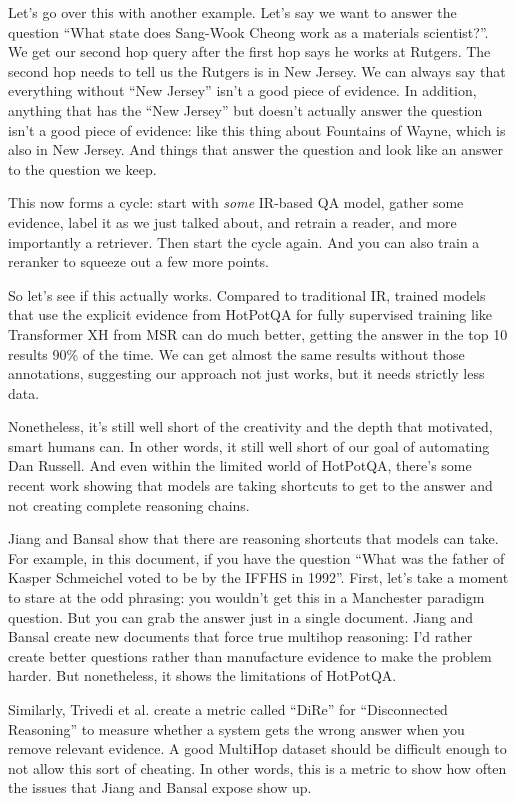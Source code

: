 Let’s go over this with another example.  Let’s say we want to answer the question “What state does Sang-Wook Cheong work as a materials scientist?”.  We get our second hop query after the first hop says he works at Rutgers.  The second hop needs to tell us the Rutgers is in New Jersey.  We can always say that everything without “New Jersey” isn’t a good piece of evidence.  In addition, anything that has the “New Jersey” but doesn’t actually answer the question isn’t a good piece of evidence: like this thing about Fountains of Wayne, which is also in New Jersey.  And things that answer the question and look like an answer to the question we keep.

This now forms a cycle: start with \emph{some} IR-based QA model, gather some evidence, label it as we just talked about, and retrain a reader, and more importantly a retriever.  Then start the cycle again.  And you can also train a reranker to squeeze out a few more points.

So let’s see if this actually works.  Compared to traditional IR, trained models that use the explicit evidence from HotPotQA for fully supervised training like Transformer XH from MSR can do much better, getting the answer in the top 10 results 90\% of the time.  We can get almost the same results without those annotations, suggesting our approach not just works, but it needs strictly less data.

Nonetheless, it’s still well short of the creativity and the depth that motivated, smart humans can.  In other words, it still well short of our goal of automating Dan Russell.  And even within the limited world of HotPotQA, there’s some recent work showing that models are taking shortcuts to get to the answer and not creating complete reasoning chains.

Jiang and Bansal show that there are reasoning shortcuts that models can take.  For example, in this document, if you have the question “What was the father of Kasper Schmeichel voted to be by the IFFHS in 1992”.  First, let’s take a moment to stare at the odd phrasing: you wouldn’t get this in a Manchester paradigm question.  But you can grab the answer just in a single document.  Jiang and Bansal create new documents that force true multihop reasoning: I’d rather create better questions rather than manufacture evidence to make the problem harder.  But nonetheless, it shows the limitations of HotPotQA.

Similarly, Trivedi et al. create a metric called “DiRe” for “Disconnected Reasoning” to measure whether a system gets the wrong answer when you remove relevant evidence.  A good MultiHop dataset should be difficult enough to not allow this sort of cheating.  In other words, this is a metric to show how often the issues that Jiang and Bansal expose show up.

